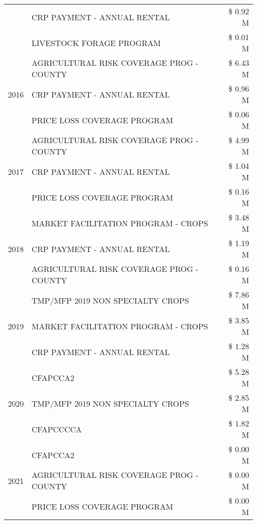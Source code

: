 \begin{tabular}{llr}
 & CRP PAYMENT - ANNUAL RENTAL & \$ 0.92 M \\
 & LIVESTOCK FORAGE PROGRAM & \$ 0.01 M \\
\cline{1-3}
\multirow[t]{3}{*}{2016} & AGRICULTURAL RISK COVERAGE PROG - COUNTY & \$ 6.43 M \\
 & CRP PAYMENT - ANNUAL RENTAL & \$ 0.96 M \\
 & PRICE LOSS COVERAGE PROGRAM & \$ 0.06 M \\
\cline{1-3}
\multirow[t]{3}{*}{2017} & AGRICULTURAL RISK COVERAGE PROG - COUNTY & \$ 4.99 M \\
 & CRP PAYMENT - ANNUAL RENTAL & \$ 1.04 M \\
 & PRICE LOSS COVERAGE PROGRAM & \$ 0.16 M \\
\cline{1-3}
\multirow[t]{3}{*}{2018} & MARKET FACILITATION PROGRAM - CROPS & \$ 3.48 M \\
 & CRP PAYMENT - ANNUAL RENTAL & \$ 1.19 M \\
 & AGRICULTURAL RISK COVERAGE PROG - COUNTY & \$ 0.16 M \\
\cline{1-3}
\multirow[t]{3}{*}{2019} & TMP/MFP 2019 NON SPECIALTY CROPS & \$ 7.86 M \\
 & MARKET FACILITATION PROGRAM - CROPS & \$ 3.85 M \\
 & CRP PAYMENT - ANNUAL RENTAL & \$ 1.28 M \\
\cline{1-3}
\multirow[t]{3}{*}{2020} & CFAPCCA2 & \$ 5.28 M \\
 & TMP/MFP 2019 NON SPECIALTY CROPS & \$ 2.85 M \\
 & CFAPCCCCA & \$ 1.82 M \\
\cline{1-3}
\multirow[t]{3}{*}{2021} & CFAPCCA2 & \$ 0.00 M \\
 & AGRICULTURAL RISK COVERAGE PROG - COUNTY & \$ 0.00 M \\
 & PRICE LOSS COVERAGE PROGRAM & \$ 0.00 M \\
\cline{1-3}
\bottomrule
\end{tabular}
